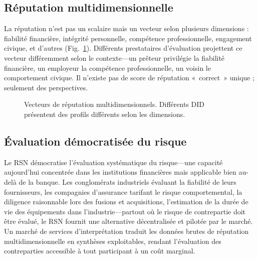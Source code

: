 \documentclass[11pt,a4paper,twocolumn]{article}
\begin{document}
\subsection{Réputation multidimensionnelle}

La réputation n'est pas un scalaire mais un vecteur selon plusieurs dimensions : fiabilité financière, intégrité personnelle, compétence professionnelle, engagement civique, et d'autres (Fig.~\ref{fig:reputation-radar}). Différents prestataires d'évaluation projettent ce vecteur différemment selon le contexte---un prêteur privilégie la fiabilité financière, un employeur la compétence professionnelle, un voisin le comportement civique. Il n'existe pas de score de réputation «~correct~» unique ; seulement des perspectives.

\begin{figure}[ht]
\centering
{}
\caption{Vecteurs de réputation multidimensionnels. Différents DID présentent des profils différents selon les dimensions.}
\label{fig:reputation-radar}
\end{figure}

\subsection{Évaluation démocratisée du risque}

Le RSN démocratise l'évaluation systématique du risque---une capacité aujourd'hui concentrée dans les institutions financières mais applicable bien au-delà de la banque. Les conglomérats industriels évaluant la fiabilité de leurs fournisseurs, les compagnies d'assurance tarifant le risque comportemental, la diligence raisonnable lors des fusions et acquisitions, l'estimation de la durée de vie des équipements dans l'industrie---partout où le risque de contrepartie doit être évalué, le RSN fournit une alternative décentralisée et pilotée par le marché. Un marché de services d'interprétation traduit les données brutes de réputation multidimensionnelle en synthèses exploitables, rendant l'évaluation des contreparties accessible à tout participant à un coût marginal.
\end{document}
